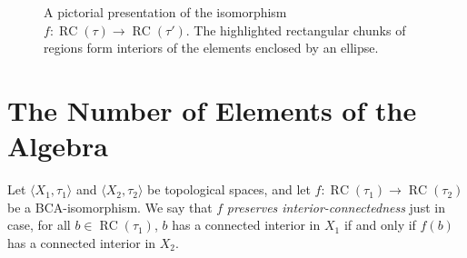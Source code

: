 \documentclass[a4paper,12pt]{amsart}
\numberwithin{equation}{section}
\theoremstyle{mytheoremstyle}
\DeclareMathOperator{\RCvtex}{RC}
\begin{document}
\begin{figure}
\caption{A pictorial presentation of the isomorphism
$f\colon \RCvtex (\tau )\to \RCvtex (\tau ')$. The highlighted rectangular chunks of regions form
interiors of the elements enclosed by an ellipse.}%
\label{fig:f-via-pic}
\end{figure}

\section{The Number of Elements of the Algebra}
\label{sec3}

Let $  \langle X_{1},\tau _{1}  \rangle $ and
$  \langle X_{2},\tau _{2}  \rangle $ be topological spaces, and
let $f\colon \RCvtex (\tau _{1})\to \RCvtex (\tau _{2})$ be a BCA-isomorphism.
We say that $f$ \emph{preserves interior-connectedness} just in case, for
all $b \in \RCvtex (\tau _{1})$, $b$ has a connected interior in $X_{1}$ if and only if
$f(b)$ has a connected interior in $X_{2}$.
\end{document}

